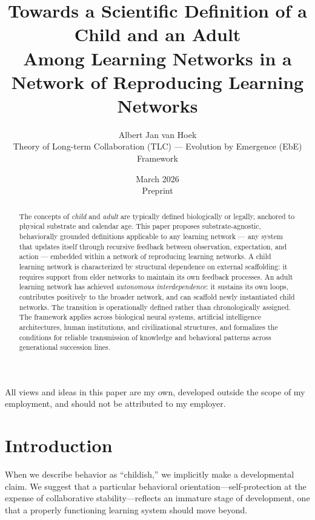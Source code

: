 \documentclass[11pt]{article}
\title{Towards a Scientific Definition of a Child and an Adult\\
Among Learning Networks in a Network of Reproducing Learning Networks}
\author{
Albert Jan van Hoek\\
Theory of Long-term Collaboration (TLC) --- Evolution by Emergence (EbE) Framework
}
\date{March 2026 \\ Preprint}
\begin{document}
\maketitle

\begin{center}
\small
All views and ideas in this paper are my own, developed outside the scope of my
employment, and should not be attributed to my employer.
\end{center}

\begin{abstract}
The concepts of \emph{child} and \emph{adult} are typically defined biologically or legally,
anchored to physical substrate and calendar age. This paper proposes substrate-agnostic,
behaviorally grounded definitions applicable to any learning network --- any system that
updates itself through recursive feedback between observation, expectation, and action ---
embedded within a network of reproducing learning networks. A child learning network is
characterized by structural dependence on external scaffolding: it requires support from
elder networks to maintain its own feedback processes. An adult learning network has achieved
\emph{autonomous interdependence}: it sustains its own loops, contributes positively to
the broader network, and can scaffold newly instantiated child networks. The transition is
operationally defined rather than chronologically assigned. The framework applies across
biological neural systems, artificial intelligence architectures, human institutions, and
civilizational structures, and formalizes the conditions for reliable transmission of
knowledge and behavioral patterns across generational succession lines.
\end{abstract}

\section{Introduction}

When we describe behavior as ``childish,'' we implicitly make a developmental claim. We
suggest that a particular behavioral orientation---self-protection at the expense of
collaborative stability---reflects an immature stage of development, one that a properly
functioning learning system should move beyond.
\end{document}
